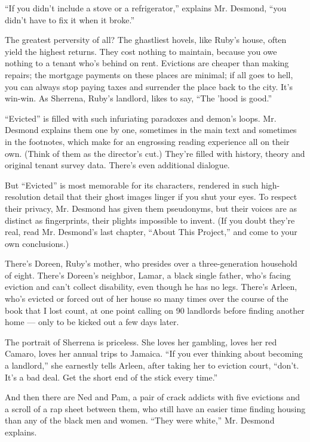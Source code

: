 ``If you didn't include a stove or a refrigerator,'' explains Mr.
Desmond, ``you didn't have to fix it when it broke.''

The greatest perversity of all? The ghastliest hovels, like Ruby's
house, often yield the highest returns. They cost nothing to maintain,
because you owe nothing to a tenant who's behind on rent. Evictions are
cheaper than making repairs; the mortgage payments on these places are
minimal; if all goes to hell, you can always stop paying taxes and
surrender the place back to the city. It's win-win. As Sherrena, Ruby's
landlord, likes to say, ``The 'hood is good.''

``Evicted'' is filled with such infuriating paradoxes and demon's loops.
Mr. Desmond explains them one by one, sometimes in the main text and
sometimes in the footnotes, which make for an engrossing reading
experience all on their own. (Think of them as the director's cut.)
They're filled with history, theory and original tenant survey data.
There's even additional dialogue.

But ``Evicted'' is most memorable for its characters, rendered in such
high-resolution detail that their ghost images linger if you shut your
eyes. To respect their privacy, Mr. Desmond has given them pseudonyms,
but their voices are as distinct as fingerprints, their plights
impossible to invent. (If you doubt they're real, read Mr. Desmond's
last chapter, ``About This Project,'' and come to your own conclusions.)

There's Doreen, Ruby's mother, who presides over a three-generation
household of eight. There's Doreen's neighbor, Lamar, a black single
father, who's facing eviction and can't collect disability, even though
he has no legs. There's Arleen, who's evicted or forced out of her house
so many times over the course of the book that I lost count, at one
point calling on 90 landlords before finding another home --- only to be
kicked out a few days later.

The portrait of Sherrena is priceless. She loves her gambling, loves her
red Camaro, loves her annual trips to Jamaica. ``If you ever thinking
about becoming a landlord,'' she earnestly tells Arleen, after taking
her to eviction court, ``don't. It's a bad deal. Get the short end of
the stick every time.''

And then there are Ned and Pam, a pair of crack addicts with five
evictions and a scroll of a rap sheet between them, who still have an
easier time finding housing than any of the black men and women. ``They
were white,'' Mr. Desmond explains.


